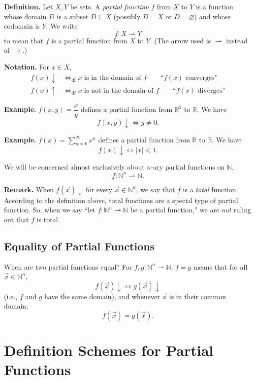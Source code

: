 \documentclass[11pt]{article}
\begin{document}
\textbf{Definition.} Let $X, Y$ be sets. A \emph{partial function} $f$ from $X$ to $Y$ is a function whose domain $D$ is a subset $D \subseteq X$ (possibly $D = X$ or $D = \varnothing$) and whose codomain is $Y$. We write
\[
    f\colon X \rightharpoonup Y
\]
to mean that $f$ is a partial function from $X$ to $Y$. (The arrow used is $\rightharpoonup$ instead of $\to$.)

\textbf{Notation.} For $x \in X$,
\begin{align*}
    f(x){\downarrow} &\iff_{\mathrm{df}} x \text{ is in the domain of } f \qquad \text{``$f(x)$ converges''} \\
    f(x){\uparrow} &\iff_{\mathrm{df}} x \text{ is not in the domain of } f \qquad \text{``$f(x)$ diverges''}
\end{align*}

\textbf{Example.} $f(x,y) = \dfrac{x}{y}$ defines a partial function from $\mathbb{R}^2$ to $\mathbb{R}$. We have
\[
    f(x,y){\downarrow} \iff y \neq 0.
\]

\textbf{Example.} $f(x) = \displaystyle\sum_{n=0}^{\infty} x^n$ defines a partial function from $\mathbb{R}$ to $\mathbb{R}$. We have
\[
    f(x){\downarrow} \iff |x| < 1.
\]

We will be concerned almost exclusively about $n$-ary partial functions on $\mathbb{N}$,
\[
    f\colon \mathbb{N}^n \rightharpoonup \mathbb{N}.
\]

\textbf{Remark.} When $f(\vec{x}){\downarrow}$ for every $\vec{x} \in \mathbb{N}^n$, we say that $f$ is a \emph{total} function. According to the definition above, total functions are a special type of partial function. So, when we say ``let $f\colon \mathbb{N}^n \rightharpoonup \mathbb{N}$ be a partial function,'' we are \emph{not} ruling out that $f$ is total.

\subsection{Equality of Partial Functions}

When are two partial functions equal? For $f, g\colon \mathbb{N}^n \rightharpoonup \mathbb{N}$, $f = g$ means that for all $\vec{x} \in \mathbb{N}^n$,
\[
    f(\vec{x}){\downarrow} \iff g(\vec{x}){\downarrow}
\]
(i.e., $f$ and $g$ have the same domain), and whenever $\vec{x}$ is in their common domain,
\[
    f(\vec{x}) = g(\vec{x}).
\]

\section{Definition Schemes for Partial Functions}
\end{document}
